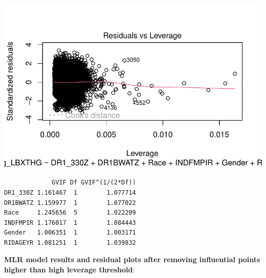 \documentclass[
  letterpaper,
  DIV=11,
  numbers=noendperiod]{scrartcl}
\begin{document}
\includegraphics{_IDS702_Final_Report_Feedback_files/figure-pdf/unnamed-chunk-21-4.pdf}

\begin{verbatim}
             GVIF Df GVIF^(1/(2*Df))
DR1_330Z 1.161467  1        1.077714
DR1BWATZ 1.159977  1        1.077022
Race     1.245656  5        1.022209
INDFMPIR 1.176017  1        1.084443
Gender   1.006351  1        1.003171
RIDAGEYR 1.081251  1        1.039832
\end{verbatim}

\textbf{MLR model results and residual plots after removing influential
points higher than high leverage threshold}:
\end{document}
